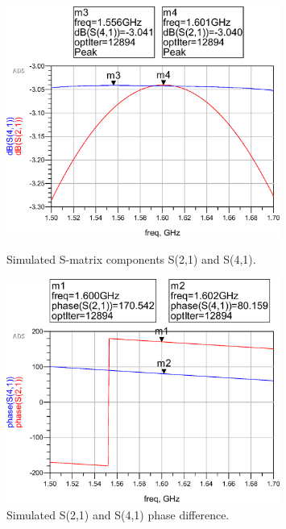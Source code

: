 \begin{figure}[h t b p]
	\centering
	\includegraphics[width=0.8\textwidth,keepaspectratio]{figures/41_21_3dB.eps}
	\caption{Simulated S-matrix components S(2,1) and S(4,1).}
	\label{fig:41_21_3dB}
%
	\includegraphics[width=0.8\textwidth,keepaspectratio]{figures/41_21_phase.eps}
	\caption{Simulated S(2,1) and S(4,1) phase difference.}
	\label{fig:41_21_phase}
\end{figure}